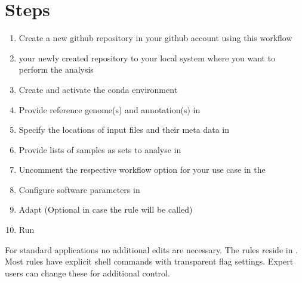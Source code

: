 \documentclass[letterpaper,10pt,english]{sphinxmanual}
\begin{document}
\section{Steps}
\label{\detokenize{index:steps}}\begin{enumerate}
%
\item {} 
Create a new github repository in your github account using this workflow 

\item {} 
 your newly created repository to your local system where you want to perform the analysis

\item {} 
Create and activate the conda environment

\item {} 
Provide reference genome(s) and annotation(s) in 

\item {} 
Specify the locations of input files and their meta data in 

\item {} 
Provide lists of samples as sets to analyse in 

\item {} 
Uncomment the respective workflow option for your use case in the 

\item {} 
Configure software parameters in 

\item {} 
Adapt  (Optional in case the  rule will be called)

\item {} 
Run 

\end{enumerate}

For standard applications no additional edits are necessary. The rules reside in . Most rules have explicit shell commands with transparent flag settings. Expert users can change these for additional control.
\end{document}
